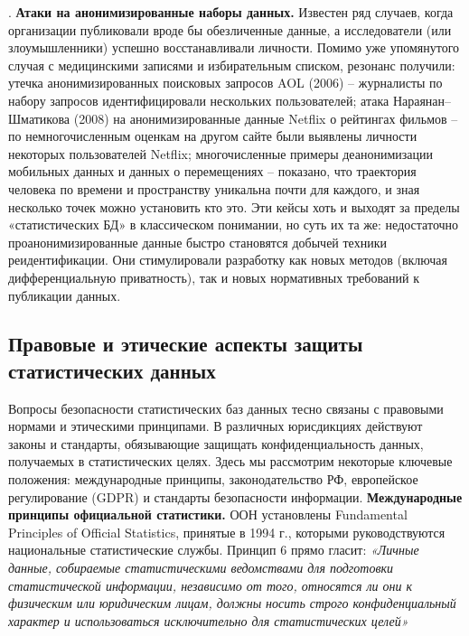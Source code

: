 . \textbf{Атаки на анонимизированные наборы данных.} Известен ряд случаев, когда организации публиковали вроде бы обезличенные данные, а исследователи (или злоумышленники) успешно восстанавливали личности. Помимо уже упомянутого случая с медицинскими записями и избирательным списком, резонанс получили: утечка анонимизированных поисковых запросов AOL (2006) – журналисты по набору запросов идентифицировали нескольких пользователей; атака Нараянан–Шматикова (2008) на анонимизированные данные Netflix о рейтингах фильмов – по немногочисленным оценкам на другом сайте были выявлены личности некоторых пользователей Netflix; многочисленные примеры деанонимизации мобильных данных и данных о перемещениях – показано, что траектория человека по времени и пространству уникальна почти для каждого, и зная несколько точек можно установить кто это. Эти кейсы хоть и выходят за пределы «статистических БД» в классическом понимании, но суть их та же: недостаточно проанонимизированные данные быстро становятся добычей техники реидентификации. Они стимулировали разработку как новых методов (включая дифференциальную приватность), так и новых нормативных требований к публикации данных. \subsection{Правовые и этические аспекты защиты статистических данных}
Вопросы безопасности статистических баз данных тесно связаны с правовыми нормами и этическими принципами. В различных юрисдикциях действуют законы и стандарты, обязывающие защищать конфиденциальность данных, получаемых в статистических целях. Здесь мы рассмотрим некоторые ключевые положения: международные принципы, законодательство РФ, европейское регулирование (GDPR) и стандарты безопасности информации. \textbf{Международные принципы официальной статистики.} ООН установлены Fundamental Principles of Official Statistics, принятые в 1994 г., которыми руководствуются национальные статистические службы. Принцип 6 прямо гласит: \textit{«Личные данные, собираемые статистическими ведомствами для подготовки статистической информации, независимо от того, относятся ли они к физическим или юридическим лицам, должны носить строго конфиденциальный характер и использоваться исключительно для статистических целей»}
\autocite{unstats-un-org}
